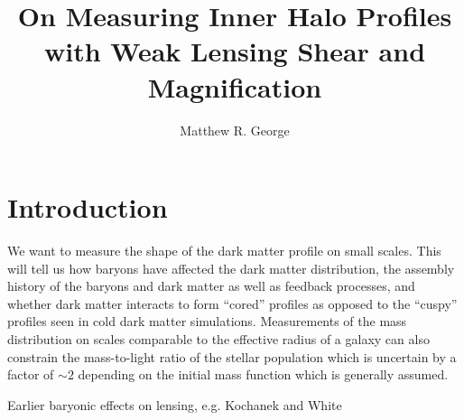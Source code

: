 \documentclass[12pt]{emulateapj}
\begin{document}
  

 \title{On Measuring Inner Halo Profiles with Weak Lensing Shear and Magnification}



\author{Matthew R. George}


  
\begin{abstract}
\end{abstract}
 



\section{Introduction}

We want to measure the shape of the dark matter profile on small
scales. This will tell us how baryons have affected the dark matter
distribution, the assembly history of the baryons and dark matter as
well as feedback processes, and whether dark matter interacts to form
``cored'' profiles as opposed to the ``cuspy'' profiles seen in cold
dark matter simulations. Measurements of the mass distribution on
scales comparable to the effective radius of a galaxy can also
constrain the mass-to-light ratio of the stellar population which is
uncertain by a factor of $\sim2$ depending on the initial mass
function which is generally assumed.

Earlier baryonic effects on lensing, e.g. Kochanek and White
 
\end{document}
